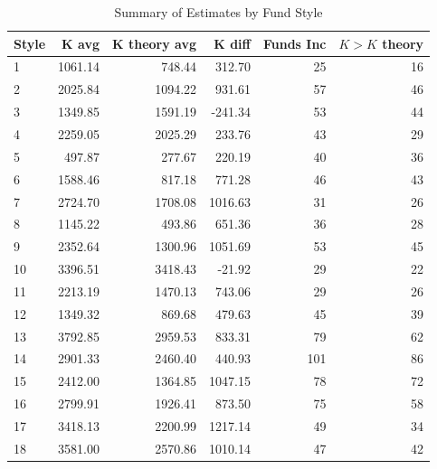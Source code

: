 \documentclass[12pt]{article}
\begin{document}
\begin{table}[H]
    \centering
    \caption{Summary of Estimates by Fund Style}
    \label{tab:style-estimates}
    \begin{tabular}{lrrrrr}
        \hline
        Style & K avg & K theory avg & K diff & Funds Inc & $K>K$ theory \\
        \hline
        1 & 1061.14 & 748.44 & 312.70 & 25 & 16 \\
        2 & 2025.84 & 1094.22 & 931.61 & 57 & 46 \\
        3 & 1349.85 & 1591.19 & -241.34 & 53 & 44 \\
        4 & 2259.05 & 2025.29 & 233.76 & 43 & 29 \\
        5 & 497.87 & 277.67 & 220.19 & 40 & 36 \\
        6 & 1588.46 & 817.18 & 771.28 & 46 & 43 \\
        7 & 2724.70 & 1708.08 & 1016.63 & 31 & 26 \\
        8 & 1145.22 & 493.86 & 651.36 & 36 & 28 \\
        9 & 2352.64 & 1300.96 & 1051.69 & 53 & 45 \\
        10 & 3396.51 & 3418.43 & -21.92 & 29 & 22 \\
        11 & 2213.19 & 1470.13 & 743.06 & 29 & 26 \\
        12 & 1349.32 & 869.68 & 479.63 & 45 & 39 \\
        13 & 3792.85 & 2959.53 & 833.31 & 79 & 62 \\
        14 & 2901.33 & 2460.40 & 440.93 & 101 & 86 \\
        15 & 2412.00 & 1364.85 & 1047.15 & 78 & 72 \\
        16 & 2799.91 & 1926.41 & 873.50 & 75 & 58 \\
        17 & 3418.13 & 2200.99 & 1217.14 & 49 & 34 \\
        18 & 3581.00 & 2570.86 & 1010.14 & 47 & 42 \\
        \hline
    \end{tabular}
\end{table}
\end{document}
